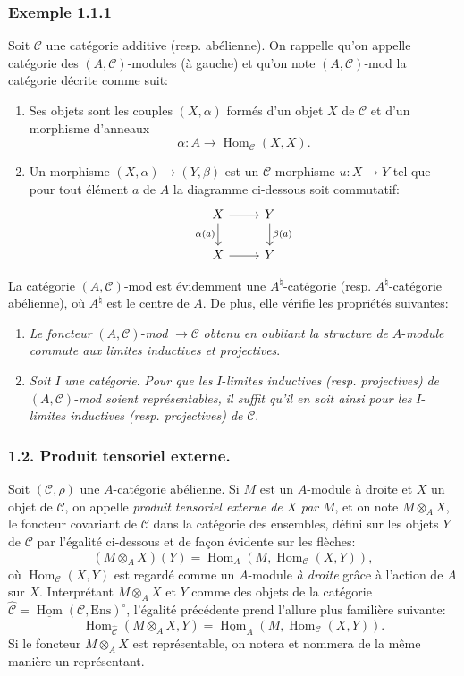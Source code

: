 \documentclass[11pt]{article}
\DeclareMathOperator{\Hom}{Hom}
\providecommand{\uHom}{\underline{\Hom}}
\providecommand{\Hom}{\operatorname{Hom}}
\providecommand{\Ens}{\mathrm{Ens}}
\providecommand{\cC}{\mathcal C}
\providecommand{\Ens}{\operatorname{Ens}}
\providecommand{\cC}{\mathcal C}
\providecommand{\Hom}{\operatorname{Hom}}
\begin{document}
\subsubsection*{Exemple 1.1.1}
Soit $\cC$ une catégorie additive (resp. abélienne). On rappelle qu'on appelle catégorie des $(A,\cC)$-modules (à gauche) et qu'on note $(A,\cC)$-mod la catégorie décrite comme suit:
\begin{enumerate}[label=(\roman*)]
\item Ses
objets sont les couples $(X,\alpha)$ formés d'un objet $X$ de $\cC$ et d'un morphisme d'anneaux
\[
\alpha:A\longrightarrow \Hom_{\cC}(X,X).
\]
\item Un morphisme $(X,\alpha)\to(Y,\beta)$ est un $\cC$-morphisme $u:X\to Y$ tel que pour tout élément $a$ de $A$ la diagramme ci-dessous soit commutatif:
\[
\begin{tikzcd}
X \arrow[r] \arrow[d,"\alpha(a)"'] & Y \arrow[d,"\beta(a)"]\\
X \arrow[r] & Y
\end{tikzcd}
\]
\end{enumerate}
La catégorie $(A,\cC)$-mod est évidemment une $A^{\natural}$-catégorie (resp. $A^{\natural}$-catégorie abélienne), où $A^{\natural}$ est le centre de $A$. De plus, elle vérifie les propriétés suivantes:
\begin{enumerate}[label=(\alph*)]
\item \emph{Le foncteur} $(A,\cC)$-\emph{mod} $\to\cC$ \emph{obtenu en oubliant la structure de} $A$-\emph{module commute aux limites inductives et projectives}.
\item \emph{Soit} $I$ \emph{une catégorie}. \emph{Pour que les} $I$-\emph{limites inductives} \emph{(resp. projectives)} \emph{de} $(A,\cC)$-\emph{mod soient représentables, il suffit qu'il en soit ainsi pour les} $I$-\emph{limites inductives (resp. projectives) de} $\cC$.
\end{enumerate}

\subsubsection*{1.2. Produit tensoriel externe.}
Soit $(\cC,\rho)$ une $A$-catégorie abélienne. Si $M$ est un $A$-module à droite et $X$ un objet de $\cC$, on appelle \emph{produit tensoriel externe de} $X$ \emph{par} $M$, et on note $M\otimes_A X$, le foncteur covariant de $\cC$ dans la catégorie des ensembles, défini sur les objets $Y$ de $\cC$ par l'égalité ci-dessous et de façon évidente sur les flèches:
\[
(M\otimes_A X)(Y)=\Hom_A(M,\Hom_{\cC}(X,Y)),
\]
où $\Hom_{\cC}(X,Y)$ est regardé comme un $A$-module \emph{à droite} grâce à l'action de $A$ sur $X$. Interprétant $M\otimes_AX$ et $Y$ comme des objets de la catégorie $\widehat{\cC}=\uHom(\cC,\Ens)^{\circ}$, l'égalité précédente prend l'allure plus familière
suivante:
\[
\Hom_{\widehat{\cC}}(M\otimes_A X,Y)=\uHom_A(M,\Hom_{\cC}(X,Y)).
\]
Si le foncteur $M\otimes_A X$ est représentable, on notera et nommera de la même manière un représentant.
\end{document}
